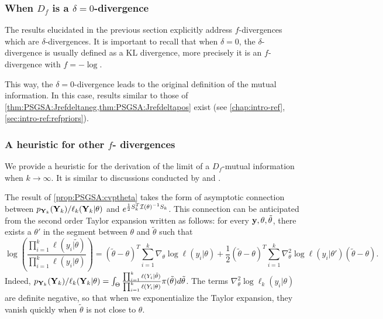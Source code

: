         \subsubsection{When $D_f$ is a $\delta=0$-divergence}

        The results elucidated in the previous section %
        explicitly address $f$-divergences which are $\delta$-divergences.
        It is important to recall that when $\delta=0$, the $\delta$-divergence is usually defined as a  $\text{KL}$ divergence, more precisely it is an $f$-divergence with $f=-\log$.

        This way, the $\delta=0$-divergence leads to the original definition of the mutual information.
        In this case, 
        results similar to those of \cref{thm:PSGSA:Jrefdeltaneg,thm:PSGSA:Jrefdeltapos} exist (see \cref{chap:intro-ref}, \cref{sec:intro-ref:refpriors}). 
        



        \subsubsection{A heuristic for other $f$- divergences}

        We provide a heuristic for the derivation of the limit of a $D_f$-mutual information when $k\to\infty$. It is similar to discussions conducted by \citet{mure_objective_2018} and \citet{xie_minimax_1997}.

        The result of \cref{prop:PSGSA:cvptheta} takes the form of asymptotic connection between $p_{\mathbf{Y}_k}(\mathbf{Y}_k)/\ell_k(\mathbf{Y}_k|\theta) $ and $e^{\frac{1}{2}S_k^T\mathcal{I}(\theta)^{-1}S_k}$. This connection can be anticipated from the second order Taylor expansion written as follows: for every $\mathbf{y},\theta, \tilde\theta$, there exists a $\theta'$ in the segment between $\theta$ and $\tilde\theta$ such that
        \begin{equation}
            \log\left(\frac{\prod_{i=1}^k \ell(y_i|\tilde\theta)}{\prod_{i=1}^k \ell(y_i|\theta)}\right) = (\tilde\theta-\theta)^T\sum_{i=1}^k\nabla_\theta\log \ell(y_i|\theta) +\frac{1}{2}(\tilde\theta-\theta)^T\sum_{i=1}^k\nabla_\theta^2\log \ell(y_i|\theta')(\tilde\theta-\theta).
        \end{equation}
        Indeed, $p_{\mathbf{Y}_k}(\mathbf{Y}_k)/\ell_k(\mathbf{Y}_k|\theta) = \int_\Theta \frac{\prod_{i=1}^k \ell(Y_i|\tilde\theta)}{\prod_{i=1}^k \ell(Y_i|\theta)} \pi(\tilde\theta)d\tilde\theta$.
        The terms $\nabla_\theta^2\log\ell_k(y_i|\theta)$ are definite negative, so that when we exponentialize the Taylor expansion, they vanish quickly when $\tilde\theta$ is not close to $\theta$.
        
